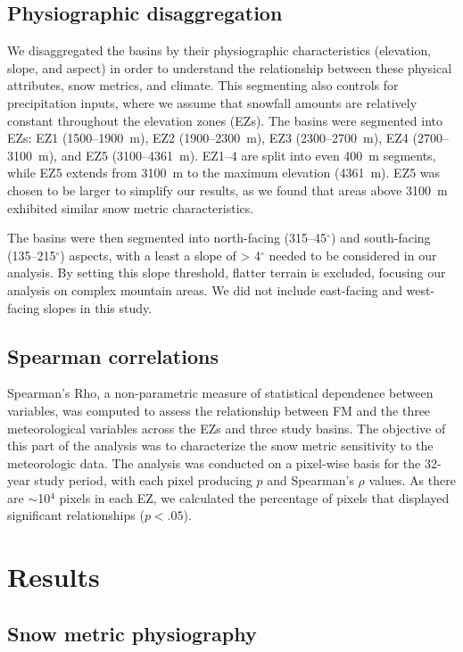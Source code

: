 \hypertarget{ch2-methods-2}{\subsection{Physiographic disaggregation}\label{ch2-methods-2}}

We disaggregated the basins by their physiographic characteristics (elevation, slope, and aspect) in order to understand the relationship between these physical attributes, snow metrics, and climate. This segmenting also controls for precipitation inputs, where we assume that snowfall amounts are relatively constant throughout the elevation zones (EZs). The basins were segmented into EZs: EZ1 (1500--1900~m), EZ2 (1900--2300~m), EZ3 (2300--2700~m), EZ4 (2700--3100~m), and EZ5 (3100--4361~m). EZ1--4 are split into even 400~m segments, while EZ5 extends from 3100~m to the maximum elevation (4361~m). EZ5 was chosen to be larger to simplify our results, as we found that areas above 3100~m exhibited similar snow metric characteristics. 

The basins were then segmented into north-facing (315--45$^{\circ}$) and south-facing (135--215$^{\circ}$) aspects, with a least a slope of > 4$^{\circ}$ needed to be considered in our analysis. By setting this slope threshold, flatter terrain is excluded, focusing our analysis on complex mountain areas. We did not include east-facing and west-facing slopes in this study. 

\hypertarget{ch2-methods-3}{\subsection{Spearman correlations}\label{ch2-methods-3}}

Spearman's Rho, a non-parametric measure of statistical dependence between variables, was computed to assess the relationship between FM and the three meteorological variables across the EZs and three study basins. The objective of this part of the analysis was to characterize the snow metric sensitivity to the meteorologic data. The analysis was conducted on a pixel-wise basis for the 32-year study period, with each pixel producing $p$ and Spearman's $\rho$ values. As there are $\sim$10$^4$ pixels in each EZ, we calculated the percentage of pixels that displayed significant relationships ($p < .05$).

\hypertarget{ch2-results}{\section{Results}\label{ch2-results}}
\hypertarget{ch2-results-1}{\subsection{Snow metric physiography}\label{ch2-results-1}}

